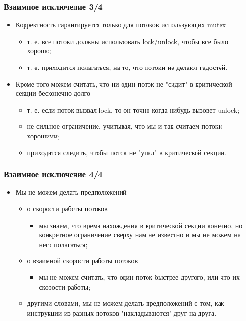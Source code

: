 \begin{frame}
\frametitle{Взаимное исключение 3/4}
\begin{itemize}
  \item Корректность гарантируется только для потоков использующих mutex
  \begin{itemize}
    \item т. е. все потоки должны использовать lock/unlock, чтобы все было
    хорошо;
    \item т. е. приходится полагаться, на то, что потоки не делают гадостей.
  \end{itemize}
  \item Кроме того можем считать, что ни один поток не "сидит" в критической
  секции бесконечно долго
  \begin{itemize}
    \item т. е. если поток вызвал lock, то он точно когда-нибудь вызовет unlock;
    \item не сильное ограничение, учитывая, что мы и так считаем потоки
    хорошими;
    \item приходится следить, чтобы поток не "упал" в критической секции.
  \end{itemize}
\end{itemize}
\end{frame}

\begin{frame}
\frametitle{Взаимное исключение 4/4}
\begin{itemize}
  \item Мы не можем делать предположений
  \begin{itemize}
    \item о скорости работы потоков
    \begin{itemize}
      \item мы знаем, что время нахождения в критической секции конечно, но
      конкретное ограничение сверху нам не известно и мы не можем на него
      полагаться;
    \end{itemize}
    \item о взаимной скорости работы потоков
    \begin{itemize}
      \item мы не можем считать, что один поток быстрее другого, или что их
      скорости работы;
    \end{itemize}
    \item другими словами, мы не можем делать предположений о том, как
    инструкции из разных потоков "накладываются" друг на друга.
  \end{itemize}
\end{itemize}
\end{frame}

